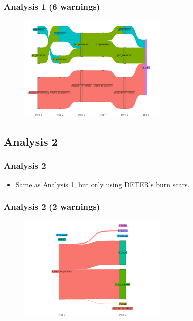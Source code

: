 \documentclass[aspectratio=169]{beamer}
\begin{document}
\begin{frame}
    \frametitle{Analysis 1 (6 warnings) }
    \begin{figure}[h] 
    \includegraphics[width=0.65\textwidth]{./figures/an1_plot_deter_prodes_subarea_trajectory_6.png}
    \end{figure}
\end{frame}


\subsection{Analysis 2}

\begin{frame}
    \frametitle{Analysis 2}
    \begin{itemize}
        \item Same as Analysis 1, but only using DETER's burn scars.
    \end{itemize}
\end{frame}

\begin{frame}
    \frametitle{Analysis 2 (2 warnings) }
    \begin{figure}[h] 
    \includegraphics[width=0.65\textwidth]{./figures/an2_plot_deter_prodes_subarea_trajectory_2.png}
    \end{figure}
\end{frame}
\end{document}
